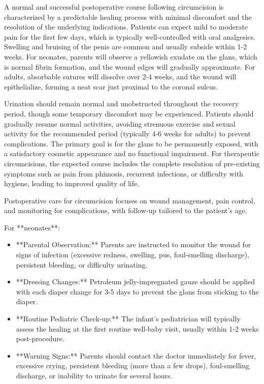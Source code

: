 A normal and successful postoperative course following circumcision is characterized by a predictable healing process with minimal discomfort and the resolution of the underlying indications. Patients can expect mild to moderate pain for the first few days, which is typically well-controlled with oral analgesics. Swelling and bruising of the penis are common and usually subside within 1-2 weeks. For neonates, parents will observe a yellowish exudate on the glans, which is normal fibrin formation, and the wound edges will gradually approximate. For adults, absorbable sutures will dissolve over 2-4 weeks, and the wound will epithelialize, forming a neat scar just proximal to the coronal sulcus.

Urination should remain normal and unobstructed throughout the recovery period, though some temporary discomfort may be experienced. Patients should gradually resume normal activities, avoiding strenuous exercise and sexual activity for the recommended period (typically 4-6 weeks for adults) to prevent complications. The primary goal is for the glans to be permanently exposed, with a satisfactory cosmetic appearance and no functional impairment. For therapeutic circumcisions, the expected course includes the complete resolution of pre-existing symptoms such as pain from phimosis, recurrent infections, or difficulty with hygiene, leading to improved quality of life.

Postoperative care for circumcision focuses on wound management, pain control, and monitoring for complications, with follow-up tailored to the patient's age.

For **neonates**:
\begin{itemize}
  \item **Parental Observation:** Parents are instructed to monitor the wound for signs of infection (excessive redness, swelling, pus, foul-smelling discharge), persistent bleeding, or difficulty urinating.
  \item **Dressing Changes:** Petroleum jelly-impregnated gauze should be applied with each diaper change for 3-5 days to prevent the glans from sticking to the diaper.
  \item **Routine Pediatric Check-up:** The infant's pediatrician will typically assess the healing at the first routine well-baby visit, usually within 1-2 weeks post-procedure.
  \item **Warning Signs:** Parents should contact the doctor immediately for fever, excessive crying, persistent bleeding (more than a few drops), foul-smelling discharge, or inability to urinate for several hours.
\end{itemize}

